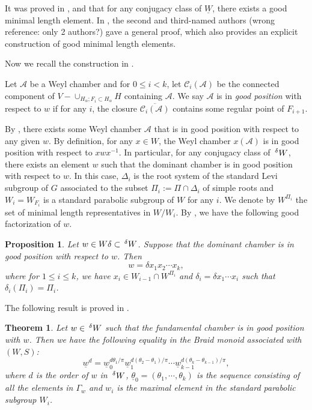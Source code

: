 \documentclass[10pt,leqno]{article}
\newtheorem{theorem}[equation]{Theorem}
\newtheorem{proposition}[equation]{Proposition}
\newcommand{\caC}{\mathcal C}
\newcommand{\caA}{\mathcal A}
\renewcommand{\a}{\mathfrak a}
\newcommand{\Wext}{\negthinspace\negthinspace\phantom{a}^\delta W}
\def\le{\leqslant}
\def\a{\alpha}
\def\G{\Gamma}
\def\d{\delta}
\def\D{\Delta}
\begin{document}
It was proved in \cite{geck_michel_good}, \cite{gkp} and \cite{he_minimal_length_double_cosets} that for any
conjugacy class of $\underline W$, there exists a good minimal length
element. In \cite{he_nie_minimal_finite}, the second and third-named authors
(wrong reference: only 2 authors?) gave a
general proof, which also provides an explicit construction of good
minimal length elements.

Now we recall the construction in \cite{he_nie_minimal_finite}.

Let $\caA$ be a Weyl chamber and for $0 \le i < k$, let $\caC_i(\caA)$
be the connected component of $V-\cup_{H_\a; F_i \subset H_\a}H$
containing $\caA$. We say $\caA$ is in {\it good position} with
respect to $w$ if for any $i$, the closure $\overline{\caC_i(\caA)}$
contains some regular point of $F_{i+1}$.

By \cite[Lemma 5.1]{he_nie_minimal_finite}, there exists some Weyl chamber $\caA$ that is
in good position with respect to any given $w$. By definition, for any
$x \in W$, the Weyl chamber $x(\caA)$ is in good position with respect
to $x w x^{-1}$. In particular, for any conjugacy class of $\Wext$,
there exists an element $w$ such that the dominant chamber is in good
position with respect to $w$. In this case, $\D_i$ is the root system
of the standard Levi subgroup of $G$ associated to the subset
$\Pi_i:=\Pi \cap \D_i$ of simple roots and $W_i=W_{F_i}$ is a standard
parabolic subgroup of $W$ for any $i$. We denote by $W^{\Pi_i}$ the
set of minimal length representatives in $W/W_i$. By \cite[Proposition
2.2]{he_nie_minimal_finite}, we have the following good factorization of $w$.

\begin{proposition}\label{good-fac} Let $w \in W \d \subset
\Wext$. Suppose that the dominant chamber is in good position with
respect to $w$. Then $$w=\d x_1 x_2 \cdots x_k,$$ where for $1 \le i
\le k$, we have $x_i \in W_{i-1} \cap W^{\Pi_i}$ and $\d_i=\d x_1
\cdots x_{i}$ such that $\d_i (\Pi_i)=\Pi_i$.
\end{proposition}

The following result is proved in \cite[Theorem 5.3]{he_nie_minimal_finite}.

\begin{theorem} Let $w \in \Wext$ such that the fundamental chamber is
in good position with $w$. Then we have the following equality in the
Braid monoid associated with $(W, S)$: $$\underline w^d=\underline
w_0^{d \theta_1/\pi} \underline w_1^{d (\theta_2-\theta_1)/\pi} \cdots
\underline w_{k-1}^{d (\theta_{k}-\theta_{k-1})/\pi},$$ where $d$ is
the order of $w$ in $\Wext$, $\underline \theta_0=(\theta_1, \cdots,
\theta_k)$ is the sequence consisting of all the elements in $\G_{w}$
and $w_i$ is the maximal element in the standard parabolic subgroup
$W_i$.
\end{theorem}
\end{document}
